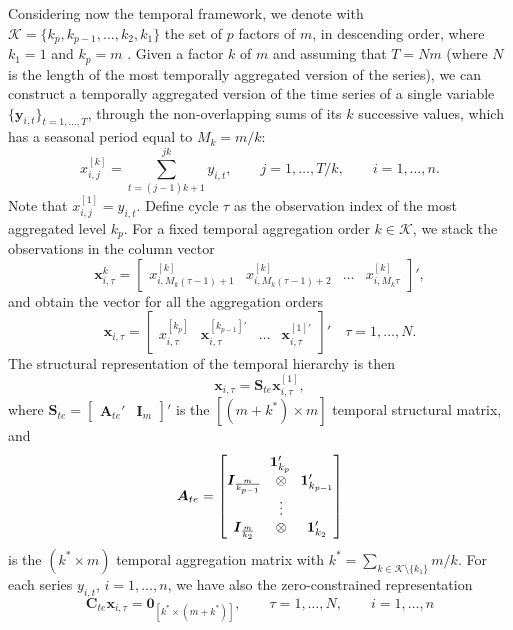 \documentclass[a4paper,11pt]{article}
\newcommand{\Unovet}{\bm{1}}
\newcommand{\xvet}{\bm{x}}
\newcommand{\yvet}{\bm{y}}
\newcommand{\Avet}{\bm{A}}
\newcommand{\Cvet}{\bm{C}}
\newcommand{\Ivet}{\bm{I}}
\newcommand{\Svet}{\bm{S}}
\newcommand{\Zerovet}{\bm{0}}
\theoremstyle{definition}
\begin{document}
Considering now the temporal framework, we denote with $\mathcal{K} = \{ k_p , k_{p-1}, \dots, k_2, k_1 \}$ the set of $p$ factors of $m$, in descending order, where $k_1= 1$ and $k_p= m$ \citep{athanasopoulos2017}. Given a factor $k$ of $m$ and assuming that $T = N m$ (where $N$ is the length of the most temporally aggregated version of the series), we can construct a temporally aggregated version of the time series of a single variable $\{\yvet_{i,t}\}_{t = 1, \dots, T}$, through the non-overlapping sums of its $k$ successive values, which has a seasonal period equal to $M_k= m/k$:
$$
	x_{i,j}^{[k]} = \sum_{t=(j-1)k+1}^{jk} y_{i,t},\qquad j = 1,\dots, T/k, \qquad i = 1,\dots,n.
$$
Note that $x_{i,j}^{[1]}=y_{i,t}$. Define cycle $\tau$ as the observation index of the most aggregated level $k_p$. For a fixed temporal aggregation order $k \in \mathcal{K}$, we stack the observations in the column vector
$$
	\xvet_{i,\tau}^{k} = \begin{bmatrix}x_{i,M_k(\tau-1)+1}^{[k]} & x_{i,M_k(\tau-1)+2}^{[k]} & \dots & x_{i,M_k\tau}^{[k]}\end{bmatrix}',
$$
and obtain the vector for all the aggregation orders
$$
	\xvet_{i,\tau} = \begin{bmatrix}
		x_{i,\tau}^{[k_p]}               &
		\xvet_{i,\tau}^{[k_{p-1}]\prime} &
		\dots                            &
		\xvet_{i,\tau}^{[1]\prime}
	\end{bmatrix}'\quad \tau = 1,\dots,N.
$$
The structural representation of the temporal hierarchy \citep{athanasopoulos2017} is then
$$
	\xvet_{i,\tau} = \Svet_{te}\xvet_{i,\tau}^{[1]},
$$
where $\Svet_{te} = \begin{bmatrix}\Avet_{te}' & \Ivet_{m}\end{bmatrix}'$ is the $[(m+k^\ast) \times m]$ temporal structural matrix, and
$$
	\Avet_{te} = \begin{bmatrix}
		\multicolumn{3}{c}{\Unovet_{k_p}'}                       \\
		\Ivet_{\frac{m}{k_{p-1}}} & \otimes & \Unovet_{k_{p-1}}' \\
		                          & \vdots  &                    \\
		\Ivet_{\frac{m}{k_{2}}}   & \otimes & \Unovet_{k_2}'
	\end{bmatrix}
$$
is the $(k^\ast \times m)$ temporal aggregation matrix with $k^\ast = \sum_{k \in \mathcal{K}\setminus\{k_1\}} m/k$. For each series $y_{i,t}$, $i = 1,\dots,n$, we have also the zero-constrained representation
\begin{equation}
	\label{eq:te_con}
	\Cvet_{te}\xvet_{i,\tau} = \Zerovet_{[k^\ast \times (m+k^\ast)]}, \qquad \tau = 1,\dots,N, \qquad i = 1,\dots, n
\end{equation}
\end{document}
